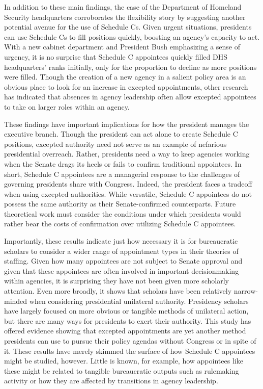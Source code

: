\documentclass[12pt]{article}
\begin{document}
In addition to these main findings, the case of the Department of Homeland Security headquarters corroborates the flexibility story by suggesting another potential avenue for the use of Schedule Cs. Given urgent situations, presidents can use Schedule Cs to fill positions quickly, boosting an agency's capacity to act. With a new cabinet department and President Bush emphasizing a sense of urgency, it is no surprise that Schedule C appointees quickly filled DHS headquarters' ranks initially, only for the proportion to decline as more positions were filled. Though the creation of a new agency in a salient policy area is an obvious place to look for an increase in excepted appointments, other research has indicated that absences in agency leadership often allow excepted appointees to take on larger roles within an agency.

These findings have important implications for how the president manages the executive branch. Though the president can act alone to create Schedule C positions, excepted authority need not serve as an example of nefarious presidential overreach. Rather, presidents need a way to keep agencies working when the Senate drags its heels or fails to confirm traditional appointees. In short, Schedule C appointees are a managerial response to the challenges of governing presidents share with Congress. Indeed, the president faces a tradeoff when using excepted authorities. While versatile, Schedule C appointees do not possess the same authority as their Senate-confirmed counterparts. Future theoretical work must consider the conditions under which presidents would rather bear the costs of confirmation over utilizing Schedule C appointees.

Importantly, these results indicate just how necessary it is for bureaucratic scholars to consider a wider range of appointment types in their theories of staffing. Given how many appointees are not subject to Senate approval and given that these appointees are often involved in important decisionmaking within agencies, it is surprising they have not been given more scholarly attention. Even more broadly, it shows that scholars have been relatively narrow-minded when considering presidential unilateral authority. Presidency scholars have largely focused on more obvious or tangible methods of unilateral action, but there are many ways for presidents to exert their authority. This study has offered evidence showing that excepted appointments are yet another method presidents can use to pursue their policy agendas without Congress or in spite of it. These results have merely skimmed the surface of how Schedule C appointees might be studied, however. Little is known, for example, how appointees like these might be related to tangible bureaucratic outputs such as rulemaking activity or how they are affected by transitions in agency leadership.
\end{document}
